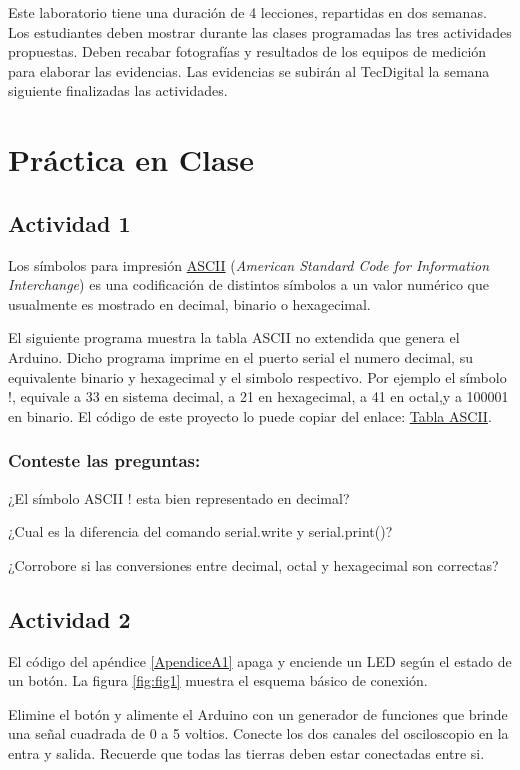 Este laboratorio tiene una duración de 4 lecciones, repartidas en dos semanas. Los estudiantes deben mostrar durante las clases programadas las tres actividades propuestas. Deben recabar fotografías y resultados de los equipos de medición para elaborar las evidencias. Las evidencias se subirán al TecDigital la semana siguiente finalizadas las actividades.

\section{Práctica en Clase}

\subsection{Actividad 1}
\label{l2:a1}
Los símbolos  para impresión \href{https://www.unicode.org/charts/PDF/U0000.pdf}{ASCII} (\textit{American Standard Code for Information Interchange}) es una codificación de distintos símbolos a un valor numérico que usualmente es mostrado en decimal, binario o hexagecimal.

El siguiente programa muestra la tabla ASCII no extendida que genera el Arduino. Dicho programa imprime en el puerto serial el numero decimal, su equivalente binario y hexagecimal y el simbolo respectivo. Por ejemplo el símbolo !, equivale a 33 en sistema decimal, a 21 en hexagecimal, a 41 en octal,y a 100001 en binario. El código de este proyecto lo puede copiar del enlace: \href{https://docs.arduino.cc/built-in-examples/communication/ASCIITable}{Tabla ASCII}.
 
\subsubsection{Conteste las preguntas:}
¿El símbolo ASCII ! esta bien representado en decimal?

¿Cual es la diferencia del comando serial.write y serial.print()?

¿Corrobore si las conversiones entre decimal, octal y hexagecimal son correctas?

\subsection{Actividad 2}
El  código del apéndice \ref{ApendiceA1} apaga y enciende un LED según el estado de un botón. La figura \ref{fig:fig1} muestra el esquema básico de conexión.

Elimine el botón y alimente el Arduino con un generador de funciones que brinde una señal cuadrada de 0 a 5 voltios. Conecte los dos canales del osciloscopio en la  entra y salida. Recuerde que todas las tierras deben estar conectadas entre si. 

